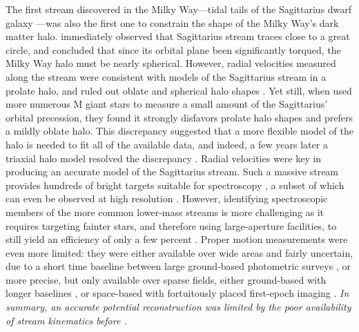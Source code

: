 \documentclass[final,5p,times,twocolumn,authoryear]{elsarticle}
\begin{document}
The first stream discovered in the Milky Way---tidal tails of the Sagittarius dwarf galaxy \citep{ibata:1995, ibata:2001a, newberg:2002, majewski:2003, belokurov:2006}---was also the first one to constrain the shape of the Milky Way's dark matter halo.
\citet{ibata:2001b} immediately observed that Sagittarius stream traces close to a great circle, and concluded that since its orbital plane  been significantly torqued, the Milky Way halo must be nearly spherical.
However, radial velocities measured along the stream were consistent with models of the Sagittarius stream in a prolate halo, and ruled out oblate and spherical halo shapes \citep{helmi:2004}.
Yet still, when \citet{johnston:2005} used more numerous M giant stars to measure a small amount of the Sagittarius' orbital precession, they found it strongly disfavors prolate halo shapes and prefers a mildly oblate halo.
This discrepancy suggested that a more flexible model of the halo is needed to fit all of the available data, and indeed, a few years later a triaxial halo model resolved the discrepancy \citep{law:2009, law:2010, deg:2013}.
Radial velocities were key in producing an accurate model of the Sagittarius stream.
Such a massive stream provides hundreds of bright targets suitable for spectroscopy \citep[e.g.,][]{majewski:2004}, a subset of which can even be observed at high resolution \citep[e.g.,][]{monaco:2007}.
However, identifying spectroscopic members of the more common lower-mass streams is more challenging as it requires targeting fainter stars, and therefore using large-aperture facilities, to still yield an efficiency of only a few percent \citep{odenkirchen:2009, kuzma:2015}.
Proper motion measurements were even more limited: they were either available over wide areas and fairly uncertain, due to a short time baseline between large ground-based photometric surveys \citep[e.g.,][]{munn:2004}, or more precise, but only available over sparse fields, either ground-based with longer baselines \citep[e.g.,][]{casetti:2006}, or space-based with fortuitously placed first-epoch imaging \citep[e.g.,][]{sohn:2016}.
\emph{In summary, an accurate potential reconstruction was limited by the poor availability of stream kinematics before \gaia.}
\end{document}
